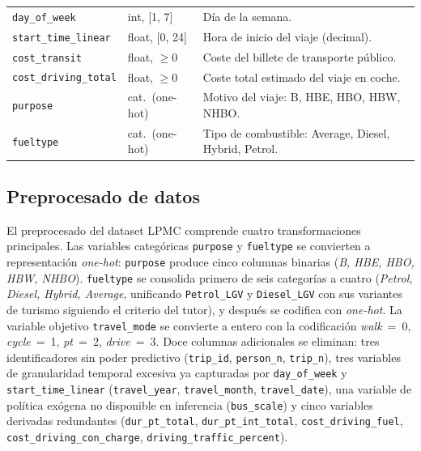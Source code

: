 \begin{table}[htbp]
\begin{tabular}{llp{5.5cm}}
    \texttt{day\_of\_week}         & int, [1, 7]      & Día de la semana. \\
    \texttt{start\_time\_linear}   & float, [0, 24]   & Hora de inicio del viaje (decimal). \\
    \texttt{cost\_transit}         & float, $\geq 0$  & Coste del billete de transporte público. \\
    \texttt{cost\_driving\_total}  & float, $\geq 0$  & Coste total estimado del viaje en coche. \\
    \texttt{purpose}               & cat.\ (one-hot)  & Motivo del viaje: B, HBE, HBO, HBW, NHBO. \\
    \texttt{fueltype}              & cat.\ (one-hot)  & Tipo de combustible: Average, Diesel, Hybrid, Petrol. \\
    \bottomrule
  \end{tabular}
\end{table}

\subsection{Preprocesado de datos}
\label{subsec:impl_lpmc_preprocesado}

El preprocesado del dataset LPMC comprende cuatro transformaciones principales. Las variables categóricas \texttt{purpose} y \texttt{fueltype} se convierten a representación \textit{one-hot}: \texttt{purpose} produce cinco columnas binarias (\textit{B, HBE, HBO, HBW, NHBO}). \texttt{fueltype} se consolida primero de seis categorías a cuatro (\textit{Petrol, Diesel, Hybrid, Average}, unificando \texttt{Petrol\_LGV} y \texttt{Diesel\_LGV} con sus variantes de turismo siguiendo el criterio del tutor), y después se codifica con \textit{one-hot}. La variable objetivo \texttt{travel\_mode} se convierte a entero con la codificación \textit{walk}~=~0, \textit{cycle}~=~1, \textit{pt}~=~2, \textit{drive}~=~3. Doce columnas adicionales se eliminan: tres identificadores sin poder predictivo (\texttt{trip\_id}, \texttt{person\_n}, \texttt{trip\_n}), tres variables de granularidad temporal excesiva ya capturadas por \texttt{day\_of\_week} y \texttt{start\_time\_linear} (\texttt{travel\_year}, \texttt{travel\_month}, \texttt{travel\_date}), una variable de política exógena no disponible en inferencia (\texttt{bus\_scale}) y cinco variables derivadas redundantes (\texttt{dur\_pt\_total}, \texttt{dur\_pt\_int\_total}, \texttt{cost\_driving\_fuel}, \texttt{cost\_driving\_con\_charge}, \texttt{driving\_traffic\_percent}).

